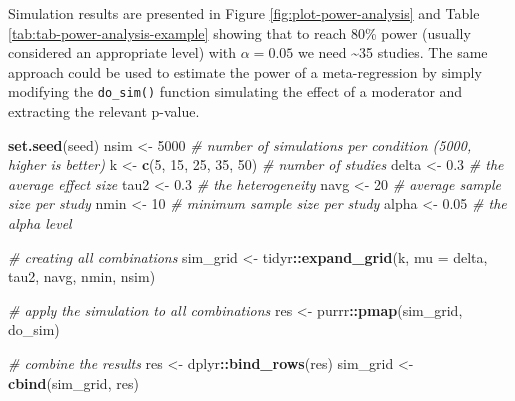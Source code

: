 \documentclass[
  man,floatsintext]{apa6}
\newenvironment{Shaded}{\begin{snugshade}}{\end{snugshade}}
\newcommand{\AttributeTok}[1]{\textcolor[rgb]{0.13,0.29,0.53}{#1}}
\newcommand{\CommentTok}[1]{\textcolor[rgb]{0.56,0.35,0.01}{\textit{#1}}}
\newcommand{\DecValTok}[1]{\textcolor[rgb]{0.00,0.00,0.81}{#1}}
\newcommand{\FloatTok}[1]{\textcolor[rgb]{0.00,0.00,0.81}{#1}}
\newcommand{\FunctionTok}[1]{\textcolor[rgb]{0.13,0.29,0.53}{\textbf{#1}}}
\newcommand{\NormalTok}[1]{#1}
\newcommand{\OtherTok}[1]{\textcolor[rgb]{0.56,0.35,0.01}{#1}}
\newcommand{\SpecialCharTok}[1]{\textcolor[rgb]{0.81,0.36,0.00}{\textbf{#1}}}
\begin{document}
\normalsize

Simulation results are presented in Figure \ref{fig:plot-power-analysis} and Table \ref{tab:tab-power-analysis-example} showing that to reach 80\% power (usually considered an appropriate level) with \(\alpha = 0.05\) we need \textasciitilde35 studies. The same approach could be used to estimate the power of a meta-regression by simply modifying the \texttt{do\_sim()} function simulating the effect of a moderator and extracting the relevant p-value.

\scriptsize

\begin{Shaded}
\begin{Highlighting}[]
\FunctionTok{set.seed}\NormalTok{(seed)}
\NormalTok{nsim }\OtherTok{\textless{}{-}} \DecValTok{5000} \CommentTok{\# number of simulations per condition (5000, higher is better)}
\NormalTok{k }\OtherTok{\textless{}{-}} \FunctionTok{c}\NormalTok{(}\DecValTok{5}\NormalTok{, }\DecValTok{15}\NormalTok{, }\DecValTok{25}\NormalTok{, }\DecValTok{35}\NormalTok{, }\DecValTok{50}\NormalTok{) }\CommentTok{\# number of studies}
\NormalTok{delta }\OtherTok{\textless{}{-}} \FloatTok{0.3} \CommentTok{\# the average effect size}
\NormalTok{tau2 }\OtherTok{\textless{}{-}} \FloatTok{0.3} \CommentTok{\# the heterogeneity}
\NormalTok{navg }\OtherTok{\textless{}{-}} \DecValTok{20} \CommentTok{\# average sample size per study}
\NormalTok{nmin }\OtherTok{\textless{}{-}} \DecValTok{10} \CommentTok{\# minimum sample size per study}
\NormalTok{alpha }\OtherTok{\textless{}{-}} \FloatTok{0.05} \CommentTok{\# the alpha level}

\CommentTok{\# creating all combinations}
\NormalTok{sim\_grid }\OtherTok{\textless{}{-}}\NormalTok{ tidyr}\SpecialCharTok{::}\FunctionTok{expand\_grid}\NormalTok{(k, }\AttributeTok{mu =}\NormalTok{ delta, tau2, navg, nmin, nsim)}

\CommentTok{\# apply the simulation to all combinations}
\NormalTok{res }\OtherTok{\textless{}{-}}\NormalTok{ purrr}\SpecialCharTok{::}\FunctionTok{pmap}\NormalTok{(sim\_grid, do\_sim)}

\CommentTok{\# combine the results}
\NormalTok{res }\OtherTok{\textless{}{-}}\NormalTok{ dplyr}\SpecialCharTok{::}\FunctionTok{bind\_rows}\NormalTok{(res)}
\NormalTok{sim\_grid }\OtherTok{\textless{}{-}} \FunctionTok{cbind}\NormalTok{(sim\_grid, res)}
\end{Highlighting}
\end{Shaded}

\normalsize
\end{document}
